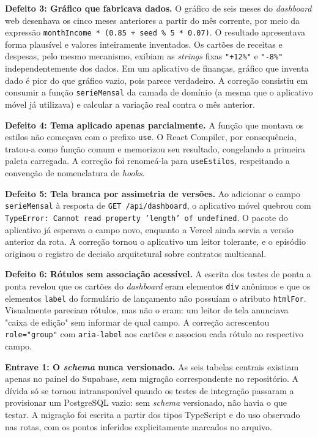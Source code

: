 \documentclass[12pt,a4paper]{article}
\begin{document}
\textbf{Defeito 3: Gráfico que fabricava dados.} O gráfico de seis meses do \textit{dashboard} web desenhava os cinco meses anteriores a partir do mês corrente, por meio da expressão \texttt{monthIncome * (0.85 + seed \% 5 * 0.07)}. O resultado apresentava forma plausível e valores inteiramente inventados. Os cartões de receitas e despesas, pelo mesmo mecanismo, exibiam as \textit{strings} fixas \texttt{"+12\%"} e \texttt{"-8\%"} independentemente dos dados. Em um aplicativo de finanças, gráfico que inventa dado é pior do que gráfico vazio, pois parece verdadeiro. A correção consistiu em consumir a função \texttt{serieMensal} da camada de domínio (a mesma que o aplicativo móvel já utilizava) e calcular a variação real contra o mês anterior.

\textbf{Defeito 4: Tema aplicado apenas parcialmente.} A função que montava os estilos não começava com o prefixo \texttt{use}. O React Compiler, por consequência, tratou-a como função comum e memorizou seu resultado, congelando a primeira paleta carregada. A correção foi renomeá-la para \texttt{useEstilos}, respeitando a convenção de nomenclatura de \textit{hooks}.

\textbf{Defeito 5: Tela branca por assimetria de versões.} Ao adicionar o campo \texttt{serieMensal} à resposta de \texttt{GET /api/dashboard}, o aplicativo móvel quebrou com \texttt{TypeError: Cannot read property 'length' of undefined}. O pacote do aplicativo já esperava o campo novo, enquanto a Vercel ainda servia a versão anterior da rota. A correção tornou o aplicativo um leitor tolerante, e o episódio originou o registro de decisão arquitetural sobre contratos multicanal.

\textbf{Defeito 6: Rótulos sem associação acessível.} A escrita dos testes de ponta a ponta revelou que os cartões do \textit{dashboard} eram elementos \texttt{div} anônimos e que os elementos \texttt{label} do formulário de lançamento não possuíam o atributo \texttt{htmlFor}. Visualmente pareciam rótulos, mas não o eram: um leitor de tela anunciava "caixa de edição" sem informar de qual campo. A correção acrescentou \texttt{role="group"} com \texttt{aria-label} aos cartões e associou cada rótulo ao respectivo campo.

\textbf{Entrave 1: O \textit{schema} nunca versionado.} As seis tabelas centrais existiam apenas no painel do Supabase, sem migração correspondente no repositório. A dívida só se tornou intransponível quando os testes de integração passaram a provisionar um PostgreSQL vazio: sem \textit{schema} versionado, não havia o que testar. A migração foi escrita a partir dos tipos TypeScript e do uso observado nas rotas, com os pontos inferidos explicitamente marcados no arquivo.
\end{document}
